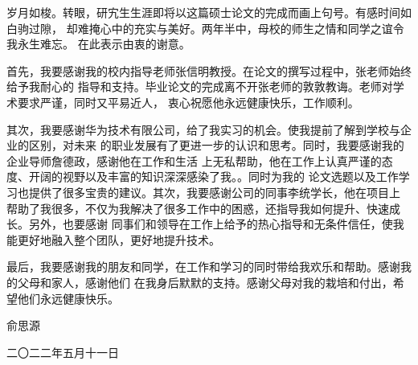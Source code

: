 
\begin{acknowledgements}

    岁月如梭。转眼，研宄生生涯即将以这篇硕士论文的完成而画上句号。有感时间如白驹过隙，
    却难掩心中的充实与美好。两年半中，母校的师生之情和同学之谊令我永生难忘。
    在此表示由衷的谢意。
    
    首先，我要感谢我的校内指导老师张信明教授。在论文的撰写过程中，张老师始终给予我耐心的
    指导和支持。毕业论文的完成离不开张老师的敦敦教诲。老师对学术要求严谨，同时又平易近人，
    衷心祝愿他永远健康快乐，工作顺利。

    其次，我要感谢华为技术有限公司，给了我实习的机会。使我提前了解到学校与企业的区别，对未来
    的职业发展有了更进一步的认识和思考。同时，我要感谢我的企业导师詹德政，感谢他在工作和生活
    上无私帮助，他在工作上认真严谨的态度、开阔的视野以及丰富的知识深深感染了我。。同时为我的
    论文选题以及工作学习也提供了很多宝贵的建议。其次，我要感谢公司的同事李统学长，他在项目上
    帮助了我很多，不仅为我解决了很多工作中的困惑，还指导我如何提升、快速成长。另外，也要感谢
    同事们和领导在工作上给予的热心指导和无条件信任，使我能更好地融入整个团队，更好地提升技术。

    最后，我要感谢我的朋友和同学，在工作和学习的同时带给我欢乐和帮助。感谢我的父母和家人，感谢他们
    在我身后默默的支持。感谢父母对我的栽培和付出，希望他们永远健康快乐。
    
    \begin{flushright}
        俞思源
    
        二〇二二年五月十一日
    \end{flushright}
\end{acknowledgements}
